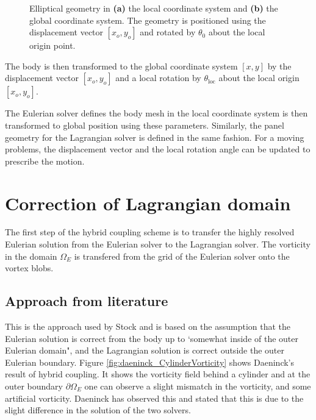 \begin{figure}[h]
     \caption{Elliptical geometry in \textbf{(a)} the local coordinate system and \textbf{(b)} the global coordinate system. The geometry is positioned using the displacement vector $[x_o,y_o]$ and rotated by $\theta_0$ about the local origin point.}
     \label{fig:positionOfBody}
	\end{figure}
	
The body is then transformed to the global coordinate system $[x,y]$ by the displacement vector $[x_o,y_o]$ and a local rotation by $\theta_{\mathrm{loc}}$ about the local origin $[x_o,y_o]$. 

The Eulerian solver defines the body mesh in the local coordinate system is then transformed to global position using these parameters. Similarly, the panel geometry for the Lagrangian solver is defined in the same fashion. For a moving problems, the displacement vector and the local rotation angle can be updated to prescribe the motion.


\section{Correction of Lagrangian domain}
\label{sec:correction}
The first step of the hybrid coupling scheme is to transfer the highly resolved Eulerian solution from the Eulerian solver to the Lagrangian solver. The vorticity in the domain $\Omega_E$ is transfered from the grid of the Eulerian solver onto the vortex blobs.
				
\subsection{Approach from literature}		

This is the approach used by Stock \cite{Stock2010a} and is based on the assumption that the Eulerian solution is correct from the body up to `somewhat inside of the outer Eulerian domain", and the Lagrangian solution is correct outside the outer Eulerian boundary. Figure \ref{fig:daeninck_CylinderVorticity} shows Daeninck's \cite{Daeninck2006} result of hybrid coupling. It shows the vorticity field behind a cylinder and at the outer boundary $\partial \Omega_E$ one can observe a slight mismatch in the vorticity, and some artificial vorticity. Daeninck has observed this and stated that this is due to the slight difference in the solution of the two solvers.

